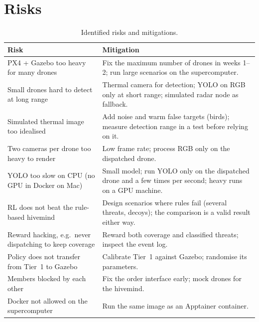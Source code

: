 \documentclass{article}
\begin{document}
\section{Risks}
\begin{table}[H]
\centering
\begin{tabular}{|p{6.5cm}|p{8.5cm}|}
\hline
\textbf{Risk} & \textbf{Mitigation} \\ \hline
PX4 + Gazebo too heavy for many drones &
  Fix the maximum number of drones in weeks 1--2; run large scenarios on
  the supercomputer. \\ \hline
Small drones hard to detect at long range &
  Thermal camera for detection; YOLO on RGB only at short range; simulated
  radar node as fallback. \\ \hline
Simulated thermal image too idealised &
  Add noise and warm false targets (birds); measure detection range in a
  test before relying on it. \\ \hline
Two cameras per drone too heavy to render &
  Low frame rate; process RGB only on the dispatched drone. \\ \hline
YOLO too slow on CPU (no GPU in Docker on Mac) &
  Small model; run YOLO only on the dispatched drone and a few times per
  second; heavy runs on a GPU machine. \\ \hline
RL does not beat the rule-based hivemind &
  Design scenarios where rules fail (several threats, decoys); the
  comparison is a valid result either way. \\ \hline
Reward hacking, e.g.\ never dispatching to keep coverage &
  Reward both coverage and classified threats; inspect the event log. \\ \hline
Policy does not transfer from Tier~1 to Gazebo &
  Calibrate Tier~1 against Gazebo; randomise its parameters. \\ \hline
Members blocked by each other &
  Fix the order interface early; mock drones for the hivemind. \\ \hline
Docker not allowed on the supercomputer &
  Run the same image as an Apptainer container. \\ \hline
\end{tabular}
\caption{Identified risks and mitigations.}
\end{table}

\newpage
\printbibliography
\end{document}
